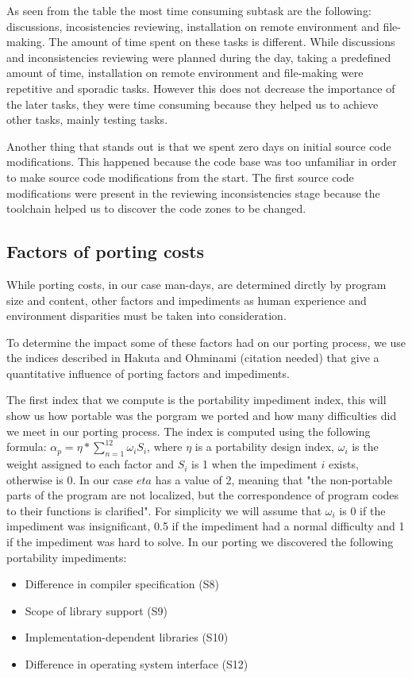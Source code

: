 As seen from the table the most time consuming subtask are the following:
discussions, incosistencies reviewing, installation on remote environment and
file-making. The amount of time spent on these tasks is different. While
discussions and inconsistencies reviewing were planned during the day, taking
a predefined amount of time, installation on remote environment and file-making
were repetitive and sporadic tasks. However this does not decrease the
importance of the later tasks, they were time consuming because they helped us
to achieve other tasks, mainly testing tasks.

Another thing that stands out is that we spent zero days on initial source code
modifications. This happened because the code base was too unfamiliar in order
to make source code modifications from the start. The first source code
modifications were present in the reviewing inconsistencies stage because the
toolchain helped us to discover the code zones to be changed.

\subsection{Factors of porting costs}

While porting costs, in our case man-days, are determined dirctly by program size and
content, other factors and impediments as human experience and environment
disparities must be taken into consideration.

To determine the impact some of these factors had on our porting process, we
use the indices described in Hakuta and Ohminami (citation needed) that give
a quantitative influence of porting factors and impediments.

The first index that we compute is the portability impediment index, this will
show us how portable was the porgram we ported and how many difficulties did
we meet in our porting process. The index is computed using the following
formula: $\alpha_p = \eta * \sum_{n=1}^{12} \omega_i S_i$, where $\eta$ is a
portability design index, $\omega_i$ is the weight assigned to each factor and
$S_i$ is 1 when the impediment $i$ exists, otherwise is 0. In our case $eta$
has a value of 2, meaning that "the non-portable parts of the program are not
localized, but the correspondence of program codes to their functions is
clarified". For simplicity we will assume that $\omega_i$ is 0 if the impediment
was insignificant, 0.5 if the impediment had a normal difficulty and 1 if the
impediment was hard to solve. In our porting we discovered the following
portability impediments:
\begin{itemize}
    \item Difference in compiler specification (S8)
    \item Scope of library support (S9)
    \item Implementation-dependent libraries (S10)
    \item Difference in operating system interface (S12)
\end{itemize}

